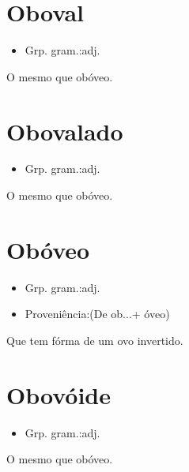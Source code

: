 \section{Oboval}
\begin{itemize}
\item {Grp. gram.:adj.}
\end{itemize}
O mesmo que \textunderscore obóveo\textunderscore .
\section{Obovalado}
\begin{itemize}
\item {Grp. gram.:adj.}
\end{itemize}
O mesmo que \textunderscore obóveo\textunderscore .
\section{Obóveo}
\begin{itemize}
\item {Grp. gram.:adj.}
\end{itemize}
\begin{itemize}
\item {Proveniência:(De \textunderscore ob...\textunderscore  + \textunderscore óveo\textunderscore )}
\end{itemize}
Que tem fórma de um ovo invertido.
\section{Obovóide}
\begin{itemize}
\item {Grp. gram.:adj.}
\end{itemize}
O mesmo que \textunderscore obóveo\textunderscore .
